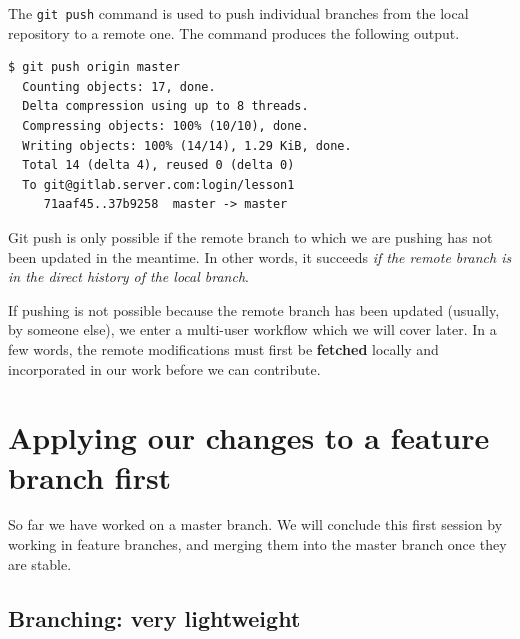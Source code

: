 \documentclass[a4paper]{../../common/tufte-latex/tufte-handout}
\begin{document}
The \texttt{git push} command is used to push individual branches from the local repository to a remote one.
The command produces the following output.

\begin{lstlisting}[style=BashInputStyle]
  $ git push origin master 
  Counting objects: 17, done.
  Delta compression using up to 8 threads.
  Compressing objects: 100% (10/10), done.
  Writing objects: 100% (14/14), 1.29 KiB, done.
  Total 14 (delta 4), reused 0 (delta 0)
  To git@gitlab.server.com:login/lesson1
     71aaf45..37b9258  master -> master
\end{lstlisting}

Git push is only possible if the remote branch to which we are pushing has not been updated in the meantime.
In other words, it succeeds \textit{if the remote branch is in the direct history of the local branch}.

If pushing is not possible because the remote branch has been updated (usually, by someone else), we enter a multi-user workflow which we will cover later.
In a few words, the remote modifications must first be \textbf{fetched} locally and incorporated in our work before we can contribute.

\section{Applying our changes to a feature branch first}

So far we have worked on a master branch.
We will conclude this first session by working in feature branches, and merging them into the master branch once they are stable.

\subsection{Branching: very lightweight}
\end{document}
